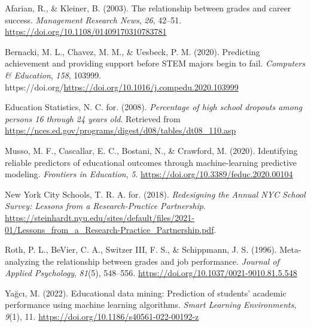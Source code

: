 \documentclass[
  man]{apa6}
\newlength{\cslhangindent}
\newlength{\cslentryspacingunit} %
\newenvironment{CSLReferences}[2] %
 {%
  \setlength{\parindent}{0pt}
  \ifodd #1
  \let\oldpar\par
  \def\par{\hangindent=\cslhangindent\oldpar}
  \fi
  \setlength{\parskip}{#2\cslentryspacingunit}
 }%
 {}
\begin{document}
\hypertarget{refs}{}
\begin{CSLReferences}{1}{0}
\leavevmode{}%
Afarian, R., \& Kleiner, B. (2003). The relationship between grades and career success. \emph{Management Research News}, \emph{26}, 42--51. \url{https://doi.org/10.1108/01409170310783781}

\leavevmode{}%
Bernacki, M. L., Chavez, M. M., \& Uesbeck, P. M. (2020). Predicting achievement and providing support before STEM majors begin to fail. \emph{Computers \& Education}, \emph{158}, 103999. https://doi.org/\url{https://doi.org/10.1016/j.compedu.2020.103999}

\leavevmode{}%
Education Statistics, N. C. for. (2008). \emph{Percentage of high school dropouts among persons 16 through 24 years old}. Retrieved from \url{https://nces.ed.gov/programs/digest/d08/tables/dt08_110.asp}

\leavevmode{}%
Musso, M. F., Cascallar, E. C., Bostani, N., \& Crawford, M. (2020). Identifying reliable predictors of educational outcomes through machine-learning predictive modeling. \emph{Frontiers in Education}, \emph{5}. \url{https://doi.org/10.3389/feduc.2020.00104}

\leavevmode{}%
New York City Schools, T. R. A. for. (2018). \emph{{R}edesigning the {A}nnual {N}{Y}{C} {S}chool {S}urvey: {L}essons from a {R}esearch-{P}ractice {P}artnership}. \url{https://steinhardt.nyu.edu/sites/default/files/2021-01/Lessons_from_a_Research-Practice_Partnership.pdf}.

\leavevmode{}%
Roth, P. L., BeVier, C. A., Switzer III, F. S., \& Schippmann, J. S. (1996). Meta-analyzing the relationship between grades and job performance. \emph{Journal of Applied Psychology}, \emph{81}(5), 548--556. \url{https://doi.org/10.1037/0021-9010.81.5.548}

\leavevmode{}%
Yağcı, M. (2022). Educational data mining: Prediction of students' academic performance using machine learning algorithms. \emph{Smart Learning Environments}, \emph{9}(1), 11. \url{https://doi.org/10.1186/s40561-022-00192-z}

\end{CSLReferences}
\end{document}
